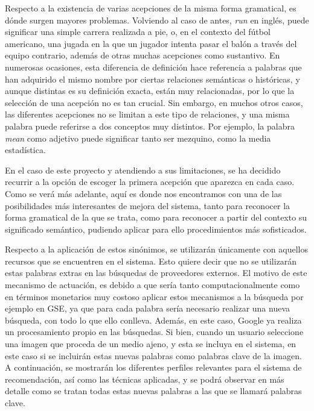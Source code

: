 Respecto a la existencia de varias acepciones de la misma forma gramatical, es dónde surgen mayores problemas. Volviendo al caso de antes, \textit{run} en inglés, puede significar una simple carrera realizada a pie, o, en el contexto del fútbol americano, una jugada en la que un jugador intenta pasar el balón a través del equipo contrario, además de otras muchas acepciones como sustantivo. En numerosas ocasiones, esta diferencia de definición hace referencia a palabras que han adquirido el mismo nombre por ciertas relaciones semánticas o históricas, y aunque distintas es su definición exacta, están muy relacionadas, por lo que la selección de una acepción no es tan crucial. Sin embargo, en muchos otros casos, las diferentes acepciones no se limitan a este tipo de relaciones, y una misma palabra puede referirse a dos conceptos muy distintos. Por ejemplo, la palabra \textit{mean} como adjetivo puede significar tanto ser mezquino, como la media estadística. 

En el caso de este proyecto y atendiendo a sus limitaciones, se ha decidido recurrir a la opción de escoger la primera acepción que aparezca en cada caso. Como se verá más adelante, aquí es donde nos encontramos con una de las posibilidades más interesantes de mejora del sistema, tanto para reconocer la forma gramatical de la que se trata, como para reconocer a partir del contexto su significado semántico, pudiendo aplicar para ello procedimientos más sofisticados. 

Respecto a la aplicación de estos sinónimos, se utilizarán únicamente con aquellos recursos que se encuentren en el sistema. Esto quiere decir que no se utilizarán estas palabras extras en las búsquedas de proveedores externos. El motivo de este mecanismo de actuación, es debido a que sería tanto computacionalmente como en términos monetarios muy costoso aplicar estos mecanismos a la búsqueda por ejemplo en \acs{GSE}, ya que para cada palabra sería necesario realizar una nueva búsqueda, con todo lo que ello conlleva. Además, en este caso, Google ya realiza un procesamiento propio en las búsquedas. Si bien, cuando un usuario seleccione una imagen que proceda de un medio ajeno, y esta se incluya en el sistema, en este caso si se incluirán estas nuevas palabras como palabras clave de la imagen. A continuación, se mostrarán los diferentes perfiles relevantes para el sistema de recomendación, así como las técnicas aplicadas, y se podrá observar en más detalle como se tratan todas estas nuevas palabras a las que se llamará palabras clave.


